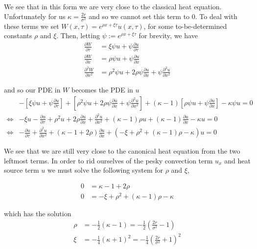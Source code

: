 \documentclass[12pt]{article}
\newlength\tindent
\renewcommand{\indent}{\hspace*{\tindent}}
\begin{document}
\indent We see that in this form we are very close to the classical heat equation. Unfortunately for us $\kappa = \frac{2r}{\sigma^2}$ and so we cannot set this term to 0. To deal with these terms we set $W(x,\tau) = e^{\rho x + \xi \tau} u(x, \tau)$, for some to-be-determined constants $\rho$ and $\xi$. Then, letting $\psi := e^{\rho x + \xi \tau}$ for brevity, we have
\begin{align*}
	\frac{\partial W}{\partial \tau} &= \xi \psi u + \psi \frac{\partial u}{\partial \tau}\\
	\frac{\partial W}{\partial x} &= \rho \psi u + \psi \frac{\partial u}{\partial x} \\
	\frac{\partial^2 W}{\partial x^2} &= \rho^2 \psi u + 2\rho \psi \frac{\partial u}{\partial x} + \psi \frac{\partial^2 u}{\partial x^2}
\end{align*}

and so our PDE in $W$ becomes the PDE in $u$
\begin{align*}
	& -\left[ \xi \psi u + \psi \frac{\partial u}{\partial \tau} \right] + \left[ \rho^2 \psi u + 2\rho \psi \frac{\partial u}{\partial x} + \psi \frac{\partial^2 u}{\partial x^2} \right] + \left( \kappa - 1 \right) \left[ \rho \psi u + \psi \frac{\partial u}{\partial x} \right] - \kappa \psi u = 0 \\
	\iff&  - \xi u -\frac{\partial u}{\partial \tau} + \rho^2 u + 2\rho \frac{\partial u}{\partial x} + \frac{\partial^2 u}{\partial x^2} + \left( \kappa - 1 \right) \rho u + (\kappa - 1) \frac{\partial u}{\partial x} - \kappa u = 0 \\
	\iff&  -\frac{\partial u}{\partial \tau} + \frac{\partial^2 u}{\partial x^2} + (\kappa - 1 + 2\rho) \frac{\partial u}{\partial x} + ( -\xi + \rho^2 + (\kappa - 1)\rho - \kappa) u = 0
\end{align*}

\indent We see that we are still very close to the canonical heat equation from the two leftmost terms. In order to rid ourselves of the pesky convection term $u_x$ and heat source term $u$ we must solve the following system for $\rho$ and $\xi$,

\begin{align*}
	0 &= \kappa - 1 + 2\rho \\
	0 &= -\xi + \rho^2 + (\kappa - 1)\rho - \kappa
\end{align*}

which has the solution
\begin{align*}
	\rho &= -\frac{1}{2} (\kappa - 1) = -\frac{1}{2} \left( \frac{2r}{\sigma^2} - 1 \right) \\
	\xi &= -\frac{1}{4} (\kappa + 1)^2 = -\frac{1}{4} \left( \frac{2r}{\sigma^2} + 1 \right)^2
\end{align*}
\end{document}
